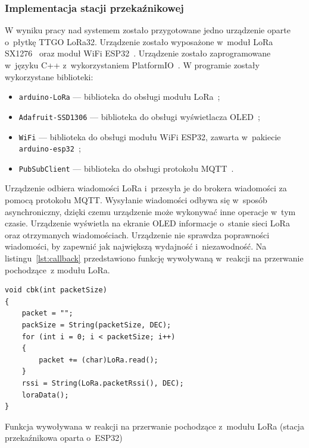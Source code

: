 \subsubsection{Implementacja stacji przekaźnikowej}
W wyniku pracy nad systemem zostało przygotowane jedno urządzenie oparte o~płytkę TTGO LoRa32.
Urządzenie zostało wyposażone w~moduł LoRa SX1276~\cite{ESP32:sx1276-doc} oraz moduł WiFi ESP32~\cite{ESP32:datasheet}.
Urządzenie zostało zaprogramowane w~języku C++ z~wykorzystaniem PlatformIO~\cite{tool:pio}.
W programie zostały wykorzystane biblioteki:
\begin{itemize}
    \item \texttt{arduino-LoRa} — biblioteka do obsługi modułu LoRa~\cite{ESP32:lora-lib};
    \item \texttt{Adafruit-SSD1306} — biblioteka do obsługi wyświetlacza OLED~\cite{ESP32:Adafruit-SSD1306};
    \item \texttt{WiFi} — biblioteka do obsługi modułu WiFi ESP32, zawarta w~pakiecie \texttt{arduino-esp32}~\cite{ESP32:Arduino};
    \item \texttt{PubSubClient} — biblioteka do obsługi protokołu MQTT~\cite{ESP32:PubSubClient}.
\end{itemize}

Urządzenie odbiera wiadomości LoRa i~przesyła je do brokera wiadomości za pomocą protokołu MQTT.
Wysyłanie wiadomości odbywa się w~sposób asynchroniczny, dzięki czemu urządzenie może wykonywać inne operacje w~tym czasie.
Urządzenie wyświetla na ekranie OLED informacje o~stanie sieci LoRa oraz otrzymanych wiadomościach.
Urządzenie nie sprawdza poprawności wiadomości, by zapewnić jak największą wydajność i~niezawodność. Na listingu~\ref{lst:callback} przedstawiono funkcję wywoływaną w~reakcji na przerwanie pochodzące~z modułu LoRa.

\begin{lstfloat}[h!]
    \lstset{language=C++}
    \begin{lstlisting}[frame=single]
void cbk(int packetSize)
{
    packet = "";
    packSize = String(packetSize, DEC);
    for (int i = 0; i < packetSize; i++)
    {
        packet += (char)LoRa.read();
    }
    rssi = String(LoRa.packetRssi(), DEC);
    loraData();
}
\end{lstlisting}
    \caption{Funkcja wywoływana w reakcji na przerwanie pochodzące z~modułu LoRa (stacja przekaźnikowa oparta o~ESP32)}\label{lst:callback}
\end{lstfloat}

